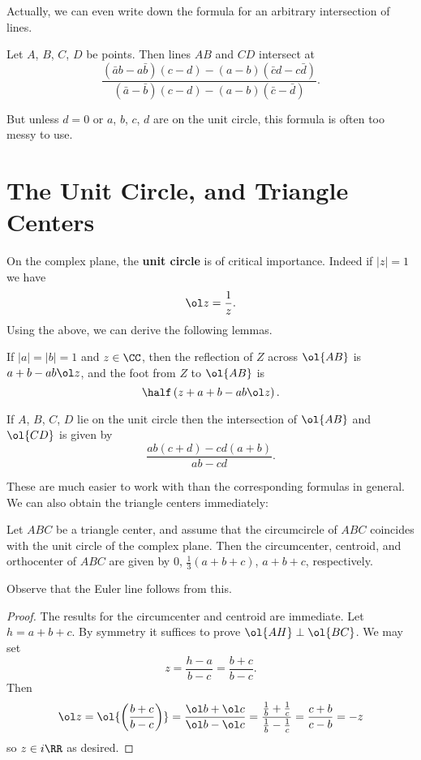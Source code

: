 \documentclass[11pt]{scrartcl}
\begin{document}
Actually, we can even write down the formula for an arbitrary intersection of lines.
\begin{proposition}
  \label{prop:complex_intersect}
  Let $A$, $B$, $C$, $D$ be points. Then lines $AB$ and $CD$ intersect at
  \[ \frac{ (\bar a b - a \bar b )(c-d) - (a-b)(\bar c d - c \bar d) }{(\bar a - \bar b )(c-d) - (a-b)(\bar c - \bar d)}. \]
\end{proposition}
But unless $d=0$ or $a$, $b$, $c$, $d$ are on the unit circle, this formula is often too messy to use.


\section{The Unit Circle, and Triangle Centers}
\label{sec:unitcircle}
On the complex plane, the \textbf{unit circle} is of critical importance.
Indeed if $\left\lvert z \right\rvert = 1$ we have \[ \ol z = \frac 1z. \]
Using the above, we can derive the following lemmas.

\begin{lemma}
  If $ \left\lvert a \right\rvert = \left\lvert b \right\rvert = 1$ and $z \in \CC$,
  then the reflection of $Z$ across $\ol{AB}$ is
  $a+b-ab \ol z$,
  and the foot from $Z$ to $\ol{AB}$ is
  \[ \half \left( z+a+b -ab \ol z \right). \]
\end{lemma}
\begin{lemma}
  If $A$, $B$, $C$, $D$ lie on the unit circle then
  the intersection of $\ol{AB}$ and $\ol{CD}$ is given by
  \[ \frac{ab(c+d)-cd(a+b)}{ab-cd}. \]
\end{lemma}

These are much easier to work with than the corresponding formulas in general.
We can also obtain the triangle centers immediately:
\begin{theorem}
  Let $ABC$ be a triangle center, and assume that the circumcircle of
  $ABC$ coincides with the unit circle of the complex plane.
  Then the circumcenter, centroid, and orthocenter of $ABC$
  are given by $0$, $\frac 13 (a+b+c)$, $a+b+c$, respectively.
\end{theorem}
Observe that the Euler line follows from this.

\begin{proof}
  The results for the circumcenter and centroid are immediate.
  Let $h = a+b+c$.
  By symmetry it suffices to prove $\ol{AH} \perp \ol{BC}$.
  We may set
  \[ z  = \frac{h-a}{b-c} = \frac{b+c}{b-c}. \]
  Then
  \[ \ol z = \ol{\left( \frac{b+c}{b-c} \right)}
    = \frac{\ol b + \ol c}{\ol b - \ol c}
    = \frac{\frac 1b + \frac 1c}{\frac 1b - \frac 1c}
    = \frac{c+b}{c-b} = -z \]
  so $z \in i \RR$ as desired.
\end{proof}
\end{document}
